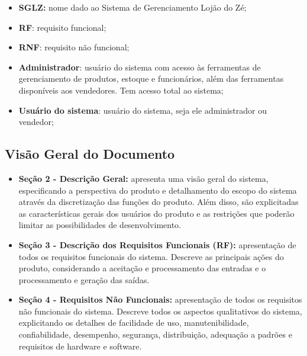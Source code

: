 \documentclass[notitlepage, draft]{article}
\begin{document}
            \begin{itemize}
            
                \item \textbf{SGLZ:} nome dado ao Sistema de Gerenciamento Lojão do Zé;
         
                \item \textbf{RF}: requisito funcional;
     
                \item \textbf{RNF}: requisito não funcional;
     
                \item \textbf{Administrador}: usuário do sistema com acesso às ferramentas de gerenciamento de produtos, estoque e funcionários, além das ferramentas disponíveis aos vendedores. Tem acesso total ao sistema;
     
                \item \textbf{Usuário do sistema}: usuário do sistema, seja ele administrador ou vendedor;
    
            \end{itemize} 
    
        \subsection{Visão Geral do Documento}
        
            \begin{itemize}
            
                \item \textbf{Seção 2  - Descrição Geral:} apresenta uma visão geral do sistema, especificando a perspectiva do produto e detalhamento do escopo do sistema através da discretização das funções do produto. Além disso, são explicitadas as características gerais dos usuários do produto e as restrições que poderão limitar as possibilidades de desenvolvimento.
        
                \item \textbf{Seção 3  - Descrição dos Requisitos Funcionais (RF):} apresentação de todos os requisitos funcionais do sistema. Descreve as principais ações do produto, considerando a aceitação e processamento das entradas e o processamento e geração das saídas.
        
                \item \textbf{Seção 4  - Requisitos Não Funcionais:} apresentação de todos os requisitos não funcionais do sistema. Descreve todos os aspectos qualitativos do sistema, explicitando os detalhes de facilidade de uso, manutenibilidade, confiabilidade, desempenho, segurança, distribuição, adequação a padrões e requisitos de hardware e software.
                
            \end{itemize}
    
\end{document}
